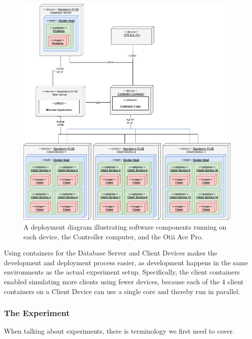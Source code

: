 \documentclass[main.tex]{subfiles}
\begin{document}
\begin{figure}[]
    \centering
    \includegraphics[width=\linewidth]{media/experiment/experiment-deployment.png}
    \caption{A deployment diagram illustrating software components running on each device, the Controller computer, and the Otii Ace Pro.}
    \label{fig:experiment-deployment}
\end{figure}

Using containers for the Database Server and Client Devices makes the development and deployment process easier, as development happens in the same environments as the actual experiment setup. Specifically, the client containers enabled simulating more clients using fewer devices, because each of the 4 client containers on a Client Device can use a single core and thereby run in parallel.

\subsubsection{The Experiment}
When talking about experiments, there is terminology we first need to cover.
\end{document}
